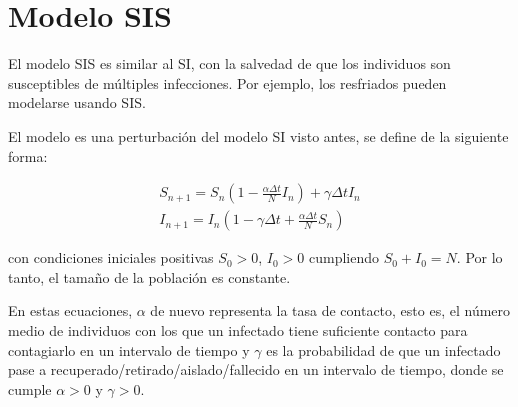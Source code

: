 \section{Modelo SIS}
El modelo SIS es similar al SI, con la salvedad de que los individuos son susceptibles de múltiples infecciones.
Por ejemplo, los resfriados pueden modelarse usando SIS.

El modelo es una perturbación del modelo SI visto antes, se define de la siguiente forma:

\begin{equation}
\label{eqn: modelo_SIS}
\begin{aligned}
S_{n+1} = S_n \left(1-\frac{\alpha\Delta t}{N} I_n \right) + \gamma \Delta t I_n \\
I_{n+1} = I_n \left( 1-\gamma \Delta t + \frac{\alpha\Delta t}{N} S_n \right)
\end{aligned}
\end{equation}

con condiciones iniciales positivas $S_0>0$, $I_0>0$ cumpliendo $S_0+I_0=N$. Por lo tanto, el tamaño de la población es constante.

En estas ecuaciones, $\alpha$ de nuevo representa la tasa de contacto, esto es, el número medio de individuos con los que un infectado tiene suficiente contacto para contagiarlo en un intervalo de tiempo y $\gamma$ es la probabilidad de que un infectado pase a recuperado/retirado/aislado/fallecido en un intervalo de tiempo, donde se cumple $\alpha >0$ y $\gamma >0$.

